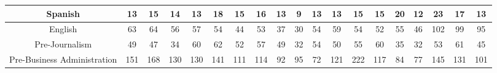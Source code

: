 \documentclass[10pt]{article}
\begin{document}
\begin{landscape}
\begin{longtable}[c]{|ccccccccccccccccccc|}
	\multicolumn{1}{|c|}{Spanish}                                    & \multicolumn{1}{c|}{13}         & \multicolumn{1}{c|}{15}         & \multicolumn{1}{c|}{14}         & \multicolumn{1}{c|}{13}         & \multicolumn{1}{c|}{18}         & \multicolumn{1}{c|}{15}         & \multicolumn{1}{c|}{16}         & \multicolumn{1}{c|}{13}         & \multicolumn{1}{c|}{9}          & \multicolumn{1}{c|}{13}         & \multicolumn{1}{c|}{13}         & \multicolumn{1}{c|}{15}         & \multicolumn{1}{c|}{15}         & \multicolumn{1}{c|}{20}         & \multicolumn{1}{c|}{12}         & \multicolumn{1}{c|}{23}         & \multicolumn{1}{c|}{17}         & 13         \\ \hline
	\multicolumn{1}{|c|}{English}                                    & \multicolumn{1}{c|}{63}         & \multicolumn{1}{c|}{64}         & \multicolumn{1}{c|}{56}         & \multicolumn{1}{c|}{57}         & \multicolumn{1}{c|}{54}         & \multicolumn{1}{c|}{44}         & \multicolumn{1}{c|}{53}         & \multicolumn{1}{c|}{37}         & \multicolumn{1}{c|}{30}         & \multicolumn{1}{c|}{54}         & \multicolumn{1}{c|}{59}         & \multicolumn{1}{c|}{54}         & \multicolumn{1}{c|}{52}         & \multicolumn{1}{c|}{55}         & \multicolumn{1}{c|}{46}         & \multicolumn{1}{c|}{102}        & \multicolumn{1}{c|}{99}         & 95         \\ \hline
	\multicolumn{1}{|c|}{Pre-Journalism}                             & \multicolumn{1}{c|}{49}         & \multicolumn{1}{c|}{47}         & \multicolumn{1}{c|}{34}         & \multicolumn{1}{c|}{60}         & \multicolumn{1}{c|}{62}         & \multicolumn{1}{c|}{52}         & \multicolumn{1}{c|}{57}         & \multicolumn{1}{c|}{49}         & \multicolumn{1}{c|}{32}         & \multicolumn{1}{c|}{54}         & \multicolumn{1}{c|}{50}         & \multicolumn{1}{c|}{55}         & \multicolumn{1}{c|}{60}         & \multicolumn{1}{c|}{35}         & \multicolumn{1}{c|}{32}         & \multicolumn{1}{c|}{53}         & \multicolumn{1}{c|}{61}         & 45         \\ \hline
	\multicolumn{1}{|c|}{Pre-Business Administration}                & \multicolumn{1}{c|}{151}        & \multicolumn{1}{c|}{168}        & \multicolumn{1}{c|}{130}        & \multicolumn{1}{c|}{130}        & \multicolumn{1}{c|}{141}        & \multicolumn{1}{c|}{111}        & \multicolumn{1}{c|}{114}        & \multicolumn{1}{c|}{92}         & \multicolumn{1}{c|}{95}         & \multicolumn{1}{c|}{72}         & \multicolumn{1}{c|}{121}        & \multicolumn{1}{c|}{222}        & \multicolumn{1}{c|}{117}        & \multicolumn{1}{c|}{84}         & \multicolumn{1}{c|}{77}         & \multicolumn{1}{c|}{145}        & \multicolumn{1}{c|}{131}        & 101        \\ \hline

\end{longtable}
\end{landscape}
\end{document}
